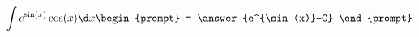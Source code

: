 \documentclass{ximera}
\author{Steven Gubkin}
\begin{document}
\begin{exercise}


\[
\int e^{\sin(x)}\cos(x) \d x \begin{prompt} = \answer{e^{\sin(x)}+C} \end{prompt}
\]

\end{exercise}
\end{document}
